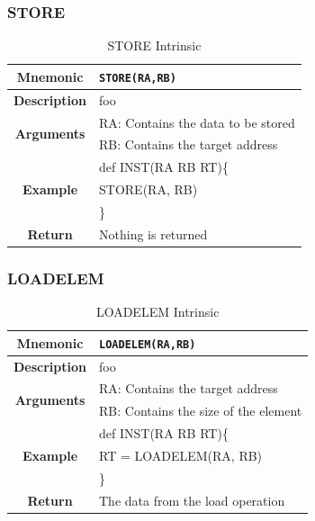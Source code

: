 \documentclass{article}
\begin{document}
\clearpage
\subsubsection{STORE}
\label{sec:STORE}

\begin{table}[h]
\begin{center}
\caption{STORE Intrinsic}
\vspace{0.125in}
\label{tab:STOREIntrinsic}
\begin{tabular}{|c|l|}
\hline
\textbf{Mnemonic} & \texttt{STORE(RA,RB)}\\
\hline
\textbf{Description} & foo\\
\hline
\multirow{2}{*}{\textbf{Arguments}} & RA: Contains the data to be stored\\
                          			     & RB: Contains the target address \\
\hline
\multirow{3}{*}{\textbf{Example}} & def INST(RA RB RT)\{\\
                          			  &   STORE(RA, RB)\\
                                                    & \}\\
\hline
\textbf{Return} & Nothing is returned\\                                                    
\hline
\end{tabular}
\end{center}
\end{table}

\clearpage
\subsubsection{LOADELEM}
\label{sec:LOADELEM}

\begin{table}[h]
\begin{center}
\caption{LOADELEM Intrinsic}
\vspace{0.125in}
\label{tab:LOADELEMIntrinsic}
\begin{tabular}{|c|l|}
\hline
\textbf{Mnemonic} & \texttt{LOADELEM(RA,RB)}\\
\hline
\textbf{Description} & foo\\
\hline
\multirow{2}{*}{\textbf{Arguments}} & RA: Contains the target address\\
                          			     & RB: Contains the size of the element \\
\hline
\multirow{3}{*}{\textbf{Example}} & def INST(RA RB RT)\{\\
                          			  &   RT = LOADELEM(RA, RB)\\
                                                    & \}\\
\hline
\textbf{Return} & The data from the load operation\\                                                    
\hline
\end{tabular}
\end{center}
\end{table}
\end{document}
